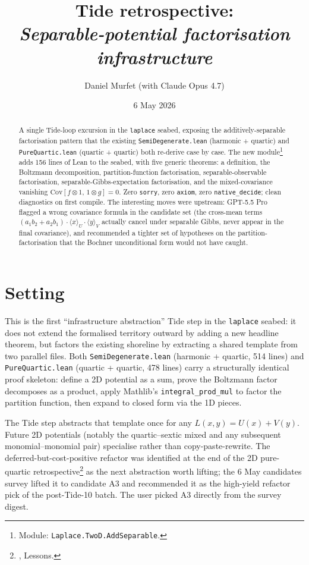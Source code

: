\documentclass[11pt]{article}
\title{Tide retrospective:\\\emph{Separable-potential factorisation infrastructure}}
\author{Daniel Murfet (with Claude Opus 4.7)}
\date{6 May 2026}
\begin{document}
\maketitle

\begin{abstract}
A single Tide-loop excursion in the \texttt{laplace} seabed, exposing
the additively-separable factorisation pattern that the existing
\texttt{SemiDegenerate.lean} (harmonic + quartic) and
\texttt{PureQuartic.lean} (quartic + quartic) both re-derive case by
case. The new module\footnote{Module:
\texttt{Laplace.TwoD.AddSeparable}.} adds 156 lines of Lean to the
seabed, with five generic theorems: a definition, the Boltzmann
decomposition, partition-function factorisation, separable-observable
factorisation, separable-Gibbs-expectation factorisation, and the
mixed-covariance vanishing $\mathrm{Cov}[f \otimes 1,\, 1 \otimes g] =
0$. Zero \texttt{sorry}, zero \texttt{axiom}, zero
\texttt{native\_decide}; clean diagnostics on first compile. The
interesting moves were upstream: GPT-5.5 Pro flagged a wrong covariance
formula in the candidate set (the cross-mean terms
$(a_1 b_2 + a_2 b_1) \cdot \langle x \rangle_U \cdot \langle y \rangle_V$
actually cancel under separable Gibbs, never appear in the final
covariance), and recommended a tighter set of hypotheses on the
partition-factorisation that the Bochner unconditional form would not
have caught.
\end{abstract}

\section{Setting}

This is the first ``infrastructure abstraction'' Tide step in the
\texttt{laplace} seabed: it does not extend the formalised territory
outward by adding a new headline theorem, but factors the existing
shoreline by extracting a shared template from two parallel files. Both
\texttt{SemiDegenerate.lean} (harmonic + quartic, 514 lines) and
\texttt{PureQuartic.lean} (quartic + quartic, 478 lines) carry a
structurally identical proof skeleton: define a 2D potential as a sum,
prove the Boltzmann factor decomposes as a product, apply Mathlib's
\texttt{integral\_prod\_mul} to factor the partition function, then
expand to closed form via the 1D pieces.

The Tide step abstracts that template once for any
$L(x, y) = U(x) + V(y)$. Future 2D potentials (notably the
quartic--sextic mixed and any subsequent monomial--monomial pair)
specialise rather than copy-paste-rewrite. The deferred-but-cost-positive
refactor was identified at the end of the 2D pure-quartic
retrospective\footnote{,
\textsection Lessons.} as the next abstraction worth lifting; the 6 May
candidates survey lifted it to candidate A3 and recommended it as the
high-yield refactor pick of the post-Tide-10 batch. The user picked
A3 directly from the survey digest.
\end{document}

